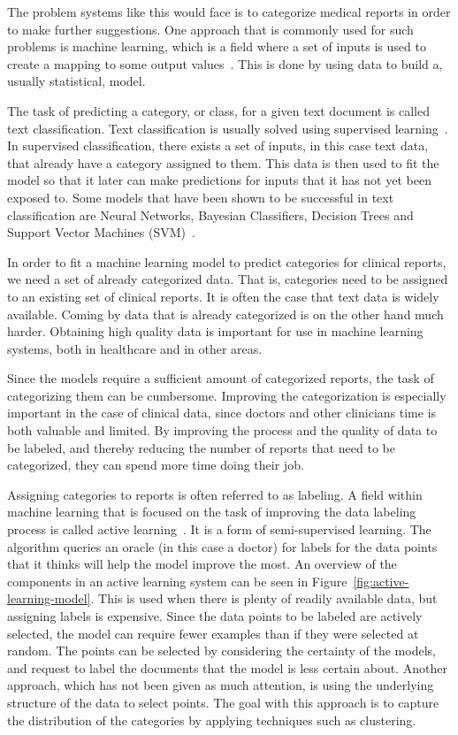 The problem systems like this would face is to categorize medical reports in order to make further suggestions.
One approach that is commonly used for such problems is machine learning, which is a field where a set of inputs is used to create a mapping to some output values~\cite{bishop2006pattern}.
This is done by using data to build a, usually statistical, model.

The task of predicting a category, or class, for a given text document is called text classification.
Text classification is usually solved using supervised learning~\cite{aggarwal2012surveyclass}. 
In supervised classification, there exists a set of inputs, in this case text data, that already have a category assigned to them.
This data is then used to fit the model so that it later can make predictions for inputs that it has not yet been exposed to.
Some models that have been shown to be successful in text classification are Neural Networks, Bayesian Classifiers, Decision Trees and Support Vector Machines (SVM)~\cite{aggarwal2012surveyclass,joachims1998text, aggarwal2012surveyclass, tong2001support}.

In order to fit a machine learning model to predict categories for clinical reports, we need a set of already categorized data.
That is, categories need to be assigned to an existing set of clinical reports.
It is often the case that text data is widely available.
Coming by data that is already categorized is on the other hand much harder.
Obtaining high quality data is important for use in machine learning systems, both in healthcare and in other areas.

Since the models require a sufficient amount of categorized reports, the task of categorizing them can be cumbersome.
Improving the categorization is especially important in the case of clinical data, since doctors and other clinicians time is both valuable and limited.
By improving the process and the quality of data to be labeled, and thereby reducing the number of reports that need to be categorized, they can spend more time doing their job.

Assigning categories to reports is often referred to as labeling.
A field within machine learning that is focused on the task of improving the data labeling process is called active learning~\cite{settles2012active}.
It is a form of semi-supervised learning.
The algorithm queries an oracle (in this case a doctor) for labels for the data points that it thinks will help the model improve the most.
An overview of the components in an active learning system can be seen in Figure~\ref{fig:active-learning-model}.
This is used when there is plenty of readily available data, but assigning labels is expensive.
Since the data points to be labeled are actively selected, the model can require fewer examples than if they were selected at random.
The points can be selected by considering the certainty of the models, and request to label the documents that the model is less certain about.
Another approach, which has not been given as much attention, is using the underlying structure of the data to select points.
The goal with this approach is to capture the distribution of the categories by applying techniques such as clustering.

